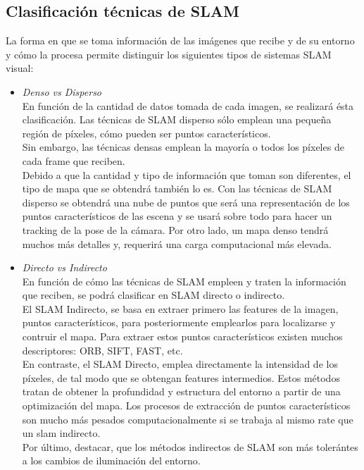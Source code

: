 \subsection{Clasificación técnicas de SLAM}
La forma en que se toma información de las imágenes que recibe y de su entorno y cómo la procesa permite distinguir los siguientes tipos de sistemas
SLAM visual:
\begin{itemize}
\item \textit{Denso vs Disperso} \\
En función de la cantidad de datos tomada de cada imagen, se realizará ésta clasificación. Las técnicas de SLAM disperso sólo emplean una pequeña
región de píxeles, cómo pueden ser puntos característicos. \\
Sin embargo, las técnicas densas emplean la mayoría o todos los píxeles de cada frame que reciben. \\

Debido a que la cantidad y tipo de información que toman son diferentes, el tipo de mapa que se obtendrá también lo es. Con las técnicas de SLAM
disperso se obtendrá una nube de puntos que será una representación de los puntos característicos de las escena y se usará sobre todo para hacer
un tracking de la pose de la cámara. Por otro lado, un mapa denso tendrá muchos más detalles y, requerirá una carga computacional más elevada.

 \item \textit{Directo vs Indirecto} \\
En función de cómo las técnicas de SLAM empleen y traten la información que reciben, se podrá clasificar en SLAM directo o indirecto.\\
El SLAM Indirecto, se basa en extraer primero las features de la imagen, puntos característicos, para posteriormente emplearlos para localizarse y contruir
el mapa. Para extraer estos puntos característicos existen muchos descriptores: ORB, SIFT, FAST, etc. \\

En contraste, el SLAM Directo, emplea directamente la intensidad de los píxeles, de tal modo que se obtengan features intermedios. Estos métodos tratan de 
obtener la profundidad y estructura del entorno a partir de una optimización del mapa. Los procesos de extracción de puntos característicos son mucho más
pesados computacionalmente si se trabaja al mismo rate que un slam indirecto.\\
Por último, destacar, que los métodos indirectos de SLAM son más tolerántes a los cambios de iluminación del entorno.\\


\end{itemize}
